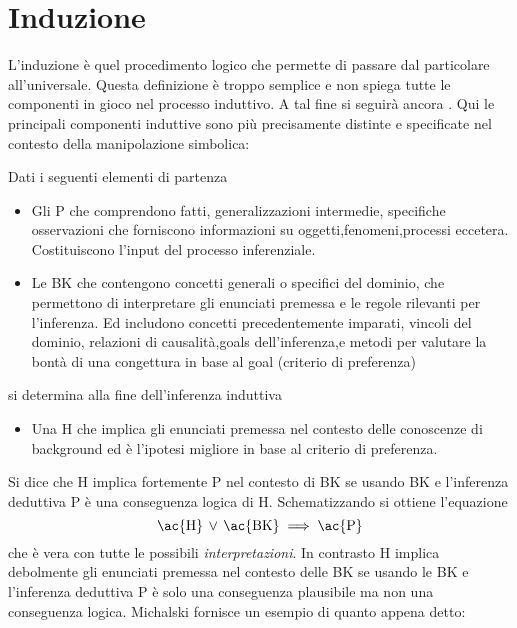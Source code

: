 \section{Induzione}
L'induzione è quel procedimento logico che permette di passare dal particolare all'universale. Questa definizione è troppo semplice e non spiega tutte le componenti in gioco nel processo induttivo. A tal fine si seguirà ancora \cite{Mic86a}. Qui le  principali componenti induttive sono più precisamente  distinte e specificate nel contesto della manipolazione simbolica:\\

\begin {description}
\item{Dati i seguenti elementi di partenza}
\begin {itemize}
\item Gli \ac{P} che comprendono fatti, generalizzazioni intermedie, specifiche osservazioni che forniscono informazioni su oggetti,fenomeni,processi eccetera. Costituiscono l'input del processo inferenziale.
\item Le \ac{BK} che contengono concetti generali o specifici del dominio, che permettono di interpretare gli enunciati premessa e le regole rilevanti per l'inferenza. Ed includono concetti precedentemente imparati, vincoli del dominio, relazioni di causalità,goals dell'inferenza,e metodi per valutare la bontà di una congettura in base al goal (criterio di preferenza)

\end{itemize}
\item{si determina alla fine dell'inferenza induttiva}
\begin{itemize}
\item Una \ac{H} che implica gli enunciati premessa nel contesto delle conoscenze di background ed è l'ipotesi migliore in base al criterio di preferenza.
\end{itemize}
\end{description}
Si dice che \ac{H} implica fortemente  \ac{P}  nel contesto di \ac{BK} se usando \ac{BK} e l'inferenza deduttiva  \ac{P} è una conseguenza logica di \ac{H}. Schematizzando si ottiene l'equazione
\begin{equation}
\label{eqn:conslogica}
\text{\ac{H}} \,  \lor \,  \text{\ac{BK}} \implies \text{\ac{P}}
\end{equation}
che è vera con tutte le possibili \textit{interpretazioni}. In contrasto \ac{H} implica debolmente gli enunciati premessa  nel contesto delle \ac{BK} se usando le \ac{BK} e l'inferenza deduttiva \ac{P} è solo una conseguenza plausibile ma non una conseguenza logica.
Michalski fornisce un esempio di quanto appena detto:\\

